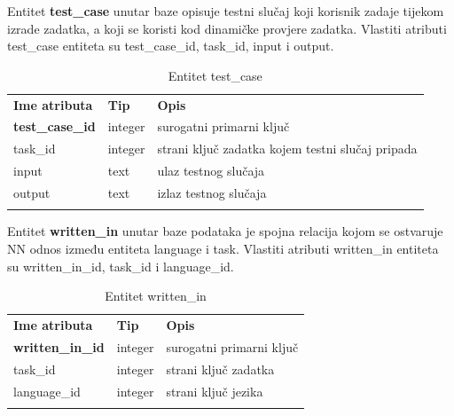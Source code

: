 \documentclass[times, utf8, zavrsni, numeric]{fer}
\begin{document}
		Entitet \textbf{test\_case} unutar baze opisuje testni slučaj koji korisnik zadaje tijekom izrade zadatka, a koji se koristi kod dinamičke provjere zadatka. Vlastiti atributi test\_case entiteta su test\_case\_id, task\_id, input i output. 
		\begin{table}[H]
			\caption{Entitet test\_case}
			\label{tbl:testcase}
			\centering
			\begin{tabu} to \textwidth {XXX}
				\tabucline[1.75pt]{-}
				\textbf{Ime atributa} & \textbf{Tip} & \textbf{Opis}\\ 				
				\tabucline[1.75pt]{-}
				\textbf{test\_case\_id} & integer & surogatni primarni ključ\\ \hline
				task\_id & integer & strani ključ zadatka kojem testni slučaj pripada\\ \hline
				input & text & ulaz testnog slučaja\\ \hline
				output & text & izlaz testnog slučaja\\ \hline
				\tabucline[1.75pt]{-}
			\end{tabu}
		\end{table}
		
		Entitet \textbf{written\_in} unutar baze podataka je spojna relacija kojom se ostvaruje NN odnos između entiteta language i task. Vlastiti atributi written\_in entiteta su written\_in\_id, task\_id i language\_id. 
		\begin{table}[H]
			\caption{Entitet written\_in}
			\label{tbl:writtenin}
			\centering
			\begin{tabu} to \textwidth {XXX}
				\tabucline[1.75pt]{-}
				\textbf{Ime atributa} & \textbf{Tip} & \textbf{Opis}\\ 				
				\tabucline[1.75pt]{-}
				\textbf{written\_in\_id} & integer & surogatni primarni ključ\\ \hline
				task\_id & integer & strani ključ zadatka\\ \hline
				language\_id & integer & strani ključ jezika\\ \hline
				\tabucline[1.75pt]{-}
			\end{tabu}
		\end{table}
		
\end{document}
